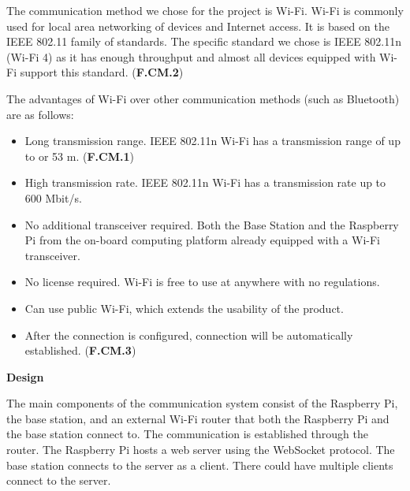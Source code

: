 The communication method we chose for the project is Wi-Fi. Wi-Fi is commonly used for local area networking of devices and Internet access. It is based on the IEEE 802.11 family of standards. The specific standard we chose is IEEE 802.11n (Wi-Fi 4) as it has enough throughput and almost all devices equipped with Wi-Fi support this standard. (\textbf{F.CM.2})

The advantages of Wi-Fi over other communication methods (such as Bluetooth) are as follows:
\begin{itemize}
    \item Long transmission range. IEEE 802.11n Wi-Fi has a transmission range of up to or 53 m. (\textbf{F.CM.1})
    \item High transmission rate. IEEE 802.11n Wi-Fi has a transmission rate up to 600 Mbit/s.
    \item No additional transceiver required. Both the Base Station and the Raspberry Pi from the on-board computing platform already equipped with a Wi-Fi transceiver.
    \item No license required. Wi-Fi is free to use at anywhere with no regulations.
    \item Can use public Wi-Fi, which extends the usability of the product.
    \item After the connection is configured, connection will be automatically established. (\textbf{F.CM.3})
\end{itemize}

\textbf{Design}

The main components of the communication system consist of the Raspberry Pi, the base station, and an external Wi-Fi router that both the Raspberry Pi and the base station connect to. The communication is established through the router. The Raspberry Pi hosts a web server using the WebSocket protocol. The base station connects to the server as a client. There could have multiple clients connect to the server.
